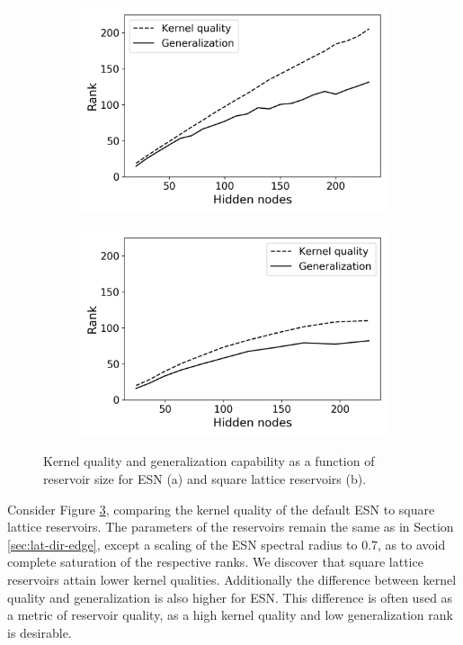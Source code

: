 \begin{figure}[htb]
  \centering
  \begin{subfigure}{.49\textwidth}
    \centering
    \includegraphics[width=1.0\linewidth]{figures/esn-rank.png}
    \caption{}
    \label{fig:rank-a}
  \end{subfigure}
  \begin{subfigure}{.49\textwidth}
    \centering
    \includegraphics[width=1.0\linewidth]{figures/sq-rank.png}
    \caption{}
    \label{fig:rank-b}
  \end{subfigure}
  \caption{
    Kernel quality and generalization capability as a function of reservoir size
for ESN (a) and square lattice reservoirs (b).
  }
  \label{fig:rank}
\end{figure}

Consider Figure \ref{fig:rank}, comparing the kernel quality of the default ESN
to square lattice reservoirs. The parameters of the reservoirs remain the same
as in Section \ref{sec:lat-dir-edge}, except a scaling of the ESN spectral
radius to 0.7, as to avoid complete saturation of the respective ranks. We
discover that square lattice reservoirs attain lower kernel
qualities. Additionally the difference between kernel quality and generalization
is also higher for ESN. This difference is often used as a metric of reservoir
quality, as a high kernel quality and low generalization rank is desirable.

